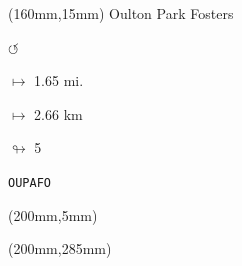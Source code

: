 \begin{textblock*}{40mm}(160mm,15mm)%
Oulton Park Fosters
\par \Huge$\circlearrowleft$
\Large
\par$\mapsto$ 1.65 mi.
\par$\mapsto$ 2.66 km
\par$\looparrowright$ 5
\par\hfill\tiny\tt OUPAFO\\
\end{textblock*}
\begin{textblock*}{20mm}(200mm,5mm)%
\fbox{\thepage}
\end{textblock*}
\begin{textblock*}{20mm}(200mm,285mm)%
\fbox{\thepage}
\end{textblock*}
\null\newpage

